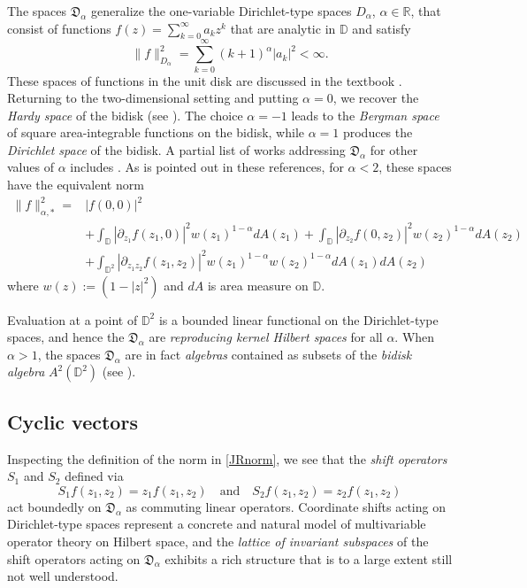 \documentclass[11 pt,reqno]{amsart}
\theoremstyle{definition}
\theoremstyle{remark}
\numberwithin{equation}{section} \numberwithin{figure}{section}
\begin{document}
The spaces $\mathfrak{D}_{\alpha}$ generalize
the one-variable Dirichlet-type spaces $D_{\alpha}$, $\alpha\in {{\mathbb R}}$,
that consist of functions $f(z)=\sum_{k=0}^{\infty}a_kz^k$ that are
analytic in ${{\mathbb D}}$ and satisfy
\[\|f\|^2_{D_{\alpha}}=\sum_{k=0}^{\infty}(k+1)^{\alpha}|a_k|^2 <
\infty.\] These spaces of functions in the unit disk are discussed in
the textbook \cite{EKMRBook}.  Returning to the two-dimensional
setting and putting $\alpha=0$, we recover the {\it Hardy space} of
the bidisk (see \cite{RudBook}). The choice $\alpha=-1$ leads to the
{\it Bergman space} of square area-integrable functions on the bidisk,
while $\alpha=1$ produces the {\it Dirichlet space} of the bidisk.  A
partial list of works addressing $\mathfrak{D}_{\alpha}$ for other
values of $\alpha$ includes \cite{Hed88, Kap94, JR06, BCLSS13II}. As
is pointed out in these references, for $\alpha <2$, these spaces have
the equivalent norm
\begin{equation*}
\begin{aligned}
\|f\|^2_{\alpha,\ast}=&|f(0,0)|^2\\
&+ \int_{{\mathbb D}}
|\partial_{z_1}f(z_1,0)|^2 w(z_1)^{1-{\alpha}} dA(z_1) + \int_{{\mathbb D}}
|\partial_{z_2}f(0,z_2)|^2 w(z_2)^{1-{\alpha}} dA(z_2) \\
&+ \int_{{{\mathbb D}}^2} 
|\partial_{z_1 z_2} f(z_1,z_2)|^2 w(z_1)^{1-{\alpha}} w(z_2)^{1-{\alpha}}
dA(z_1)dA(z_2)
\end{aligned}
\end{equation*}
where $w(z) := (1-|z|^2)$ and $dA$ is area measure on ${{\mathbb D}}$. 

Evaluation at a point of $\mathbb{D}^2$ is a bounded linear functional
on the Dirichlet-type spaces, and hence the $\mathfrak{D}_{\alpha}$
are {\it reproducing kernel Hilbert spaces} for all $\alpha$. When
$\alpha>1$, the spaces $\mathfrak{D}_{\alpha}$ are in fact {\it
  algebras} contained as subsets of the {\it bidisk algebra}
$A^2(\mathbb{D}^2)$ (see \cite{RudBook}).

\subsection{Cyclic vectors}
Inspecting the definition of the norm in \eqref{JRnorm}, we see that the {\it shift operators}
$S_1$ and $S_2$ defined via
\begin{equation*}
S_1f(z_1,z_2)=z_1f(z_1,z_2) \quad \textrm{and}\quad S_2f(z_1,z_2)=z_2f(z_1,z_2)
\end{equation*}
act boundedly on $\mathfrak{D}_{\alpha}$ as commuting linear operators. 
Coordinate shifts acting on Dirichlet-type spaces represent a concrete and 
natural model of multivariable operator theory on Hilbert space, and the 
{\it lattice of invariant subspaces} of the shift operators acting on 
$\mathfrak{D}_{\alpha}$ exhibits a rich structure that is to a large extent 
still not well understood.
\end{document}
